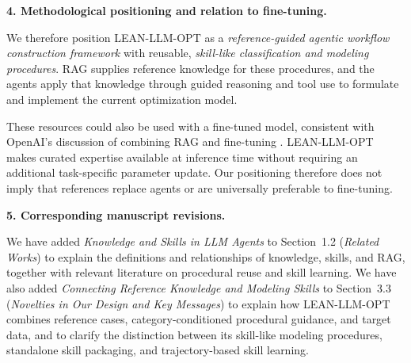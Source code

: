 \documentclass[11pt]{article}
\begin{document}
{\medskip
\noindent\textbf{4. Methodological positioning and relation to fine-tuning.}

We therefore position LEAN-LLM-OPT as a \emph{reference-guided
agentic workflow construction framework} with reusable,
\emph{skill-like classification and modeling procedures}.
RAG supplies reference knowledge for these procedures, and the
agents apply that knowledge through guided reasoning and tool
use to formulate and implement the current optimization model.

These resources could also be used with a fine-tuned model,
consistent with OpenAI's discussion of combining RAG and
fine-tuning \citep{ae1_openai2026accuracy}. LEAN-LLM-OPT makes
curated expertise available at inference time without requiring
an additional task-specific parameter update. Our positioning
therefore does not imply that references replace agents or are
universally preferable to fine-tuning.

\medskip
\noindent\textbf{5. Corresponding manuscript revisions.}

We have added \emph{Knowledge and Skills in LLM Agents} to
Section~1.2 (\emph{Related Works}) to explain the definitions
and relationships of knowledge, skills, and RAG, together with
relevant literature on procedural reuse and skill learning.
We have also added \emph{Connecting Reference Knowledge and
Modeling Skills} to Section~3.3 (\emph{Novelties in Our Design
and Key Messages}) to explain how LEAN-LLM-OPT combines reference
cases, category-conditioned procedural guidance, and target data,
and to clarify the distinction between its skill-like modeling
procedures, standalone skill packaging, and trajectory-based
skill learning.
}
\end{document}
